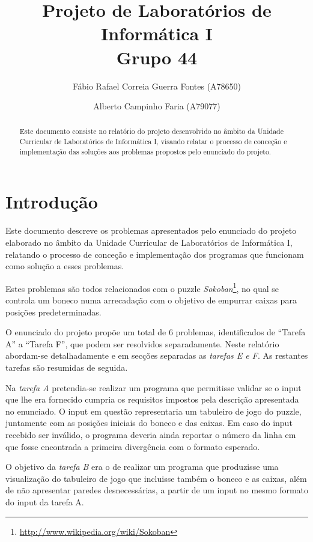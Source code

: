 \documentclass[a4paper]{article}
\title{Projeto de Laboratórios de Informática I\\Grupo 44}
\author{Fábio Rafael Correia Guerra Fontes (A78650) \and Alberto Campinho Faria (A79077)}
\begin{document}
\maketitle

\begin{abstract}
Este documento consiste no relatório do projeto desenvolvido no âmbito da Unidade Curricular de Laboratórios de Informática I, visando relatar o processo de conceção e implementação das soluções aos problemas propostos pelo enunciado do projeto.
\end{abstract}

\tableofcontents

\section{Introdução}

Este documento descreve os problemas apresentados pelo enunciado do projeto elaborado no âmbito da Unidade Curricular de Laboratórios de Informática I, relatando o processo de conceção e implementação dos programas que funcionam como solução a esses problemas.

Estes problemas são todos relacionados com o puzzle \textit{Sokoban}\footnote{\url{http://www.wikipedia.org/wiki/Sokoban}}, no qual se controla um boneco numa arrecadação com o objetivo de empurrar caixas para posições predeterminadas.

O enunciado do projeto propõe um total de 6 problemas, identificados de ``Tarefa A'' a ``Tarefa F'', que podem ser resolvidos separadamente. Neste relatório abordam-se detalhadamente e em secções separadas as \emph{tarefas E e F}. As restantes tarefas são resumidas de seguida.

\bigskip

Na \emph{tarefa A} pretendia-se realizar um programa que permitisse validar se o input que lhe era fornecido cumpria os requisitos impostos pela descrição apresentada no enunciado. O input em questão representaria um tabuleiro de jogo do puzzle, juntamente com as posições iniciais do boneco e das caixas. Em caso do input recebido ser inválido, o programa deveria ainda reportar o número da linha em que fosse encontrada a primeira divergência com o formato esperado.

O objetivo da \emph{tarefa B} era o de realizar um programa que produzisse uma visualização do tabuleiro de jogo que incluisse também o boneco e as caixas, além de não apresentar paredes desnecessárias, a partir de um input no mesmo formato do input da tarefa A.
\end{document}
